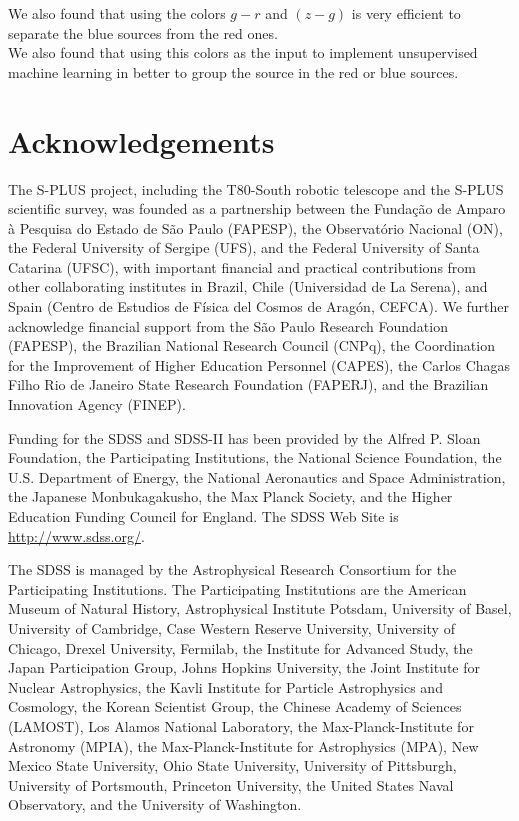 \documentclass[fleqn,usenatbib]{mnras}
\begin{document}
We also found that using the colors $g - r$ and $(z - g)$ is very efficient to separate
the blue sources from the red ones. \\

We also found that using this colors as the input to implement unsupervised machine 
learning in better to group the source in the red or blue sources.

\section*{Acknowledgements}

The S-PLUS project, including the T80-South robotic telescope and
the S-PLUS scientific survey, was founded as a partnership between the
Fundação de Amparo à Pesquisa do Estado de S\~{a}o Paulo
(FAPESP), the Observatório Nacional (ON), the Federal University of
Sergipe (UFS), and the Federal University of Santa Catarina
(UFSC), with important financial and practical contributions from
other collaborating institutes in Brazil, Chile (Universidad de La
Serena), and Spain (Centro de Estudios de Física del Cosmos de
Aragón, CEFCA). We further acknowledge financial support from
the São Paulo Research Foundation (FAPESP), the Brazilian National
Research Council (CNPq), the Coordination for the Improvement of
Higher Education Personnel (CAPES), the Carlos Chagas Filho Rio
de Janeiro State Research Foundation (FAPERJ), and the Brazilian
Innovation Agency (FINEP).

Funding for the SDSS and SDSS-II has been provided by the Alfred P.
Sloan Foundation, the Participating Institutions, the National Science
Foundation, the U.S. Department of Energy, the National Aeronautics
and Space Administration, the Japanese Monbukagakusho, the Max
Planck Society, and the Higher Education Funding Council for England.
The SDSS Web Site is \url{http://www.sdss.org/}.

The SDSS is managed by the Astrophysical Research Consortium for
the Participating Institutions. The Participating Institutions
are the American Museum of Natural History, Astrophysical Institute Potsdam,
University of Basel, University of Cambridge, Case Western Reserve University,
University of Chicago, Drexel University, Fermilab, the Institute for Advanced
Study, the Japan Participation Group, Johns Hopkins University, the Joint
Institute for Nuclear Astrophysics, the Kavli Institute for Particle Astrophysics
and Cosmology, the Korean Scientist Group, the Chinese Academy of Sciences (LAMOST),
Los Alamos National Laboratory, the Max-Planck-Institute for Astronomy (MPIA),
the Max-Planck-Institute for Astrophysics (MPA), New Mexico State University,
Ohio State University, University of Pittsburgh, University of Portsmouth,
Princeton University, the United States Naval Observatory, and the University
of Washington.
\end{document}
